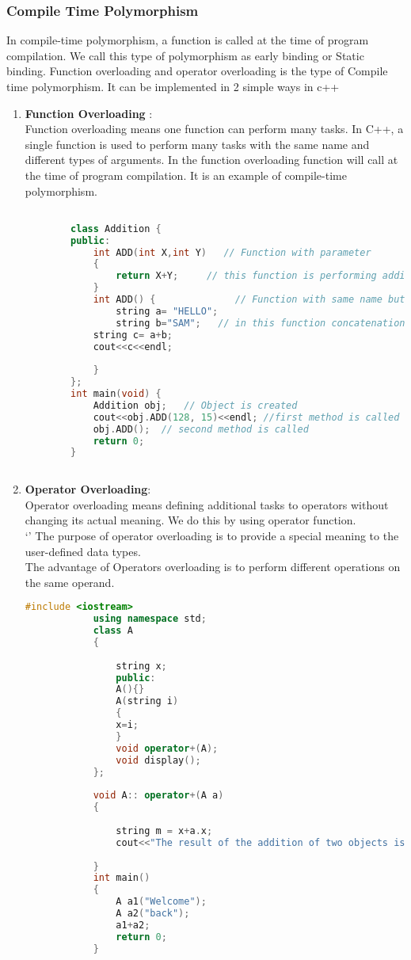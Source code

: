 \documentclass[11pt]{article}
\begin{document}
\subsubsection*{Compile Time Polymorphism}
\noindent
In compile-time polymorphism, a function is called at the time of program compilation. We call this type of polymorphism as early binding or Static binding. Function overloading and operator overloading is the type of Compile time polymorphism. It can be implemented in 2 simple ways in c++
\begin{enumerate}
	\item \textbf{Function Overloading} : \\
	      Function overloading means one function can perform many tasks. In C++, a single function is used to perform many tasks with the same name and different types of arguments. In the function overloading function will call at the time of program compilation. It is an example of compile-time polymorphism.
	      \begin{lstlisting}[language=C++]

		class Addition {
		public:
			int ADD(int X,int Y)   // Function with parameter 
			{
				return X+Y;     // this function is performing addition of  two Integer value
			}
			int ADD() {              // Function with same name but without parameter
				string a= "HELLO";
				string b="SAM";   // in this function concatenation is performed
			string c= a+b;
			cout<<c<<endl;
				
			}
		};
		int main(void) {
			Addition obj;   // Object is created  
			cout<<obj.ADD(128, 15)<<endl; //first method is called
			obj.ADD();  // second method is called
			return 0;
		}
		
	\end{lstlisting}
	\item \textbf{Operator Overloading}: \\
	      Operator overloading means defining additional tasks to operators without changing its actual meaning. We do this by using operator function.\\`'
	      The purpose of operator overloading is to provide a special meaning to the user-defined data types.\\
	      The advantage of Operators overloading is to perform different operations on the same operand.


	      \begin{lstlisting}[language=C++]
			#include <iostream>  
			using namespace std;  
			class A  
			{  
				
				string x;  
				public:  
				A(){}  
				A(string i)  
				{  
				x=i;  
				}  
				void operator+(A);  
				void display();  
			};  
			
			void A:: operator+(A a)  
			{  
				
				string m = x+a.x;  
				cout<<"The result of the addition of two objects is : "<<m;  
			
			}  
			int main()  
			{  
				A a1("Welcome");  
				A a2("back");  
				a1+a2;  
				return 0;  
			}
			
	\end{lstlisting}
\end{enumerate}
\end{document}
